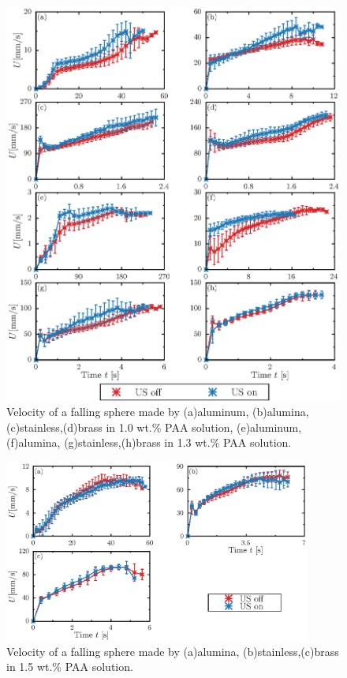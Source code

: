 \begin{figure}[H]
    \centering
    \includegraphics[width=1.0\textwidth]{5-Results/1.0-1.3.eps}
    \caption{Velocity of a falling sphere made by (a)aluminum, (b)alumina, (c)stainless,(d)brass in 1.0 wt.\% PAA solution, (e)aluminum, (f)alumina, (g)stainless,(h)brass in 1.3 wt.\% PAA solution.}
    \label{fig:1.0-1.3}
\end{figure}

\newpage

\begin{figure}[H]
    \centering
    \includegraphics[width=0.9\textwidth]{5-Results/1.5.eps}
    \caption{Velocity of a falling sphere made by (a)alumina, (b)stainless,(c)brass in 1.5 wt.\% PAA solution.}
    \label{fig:1.5}
\end{figure}

